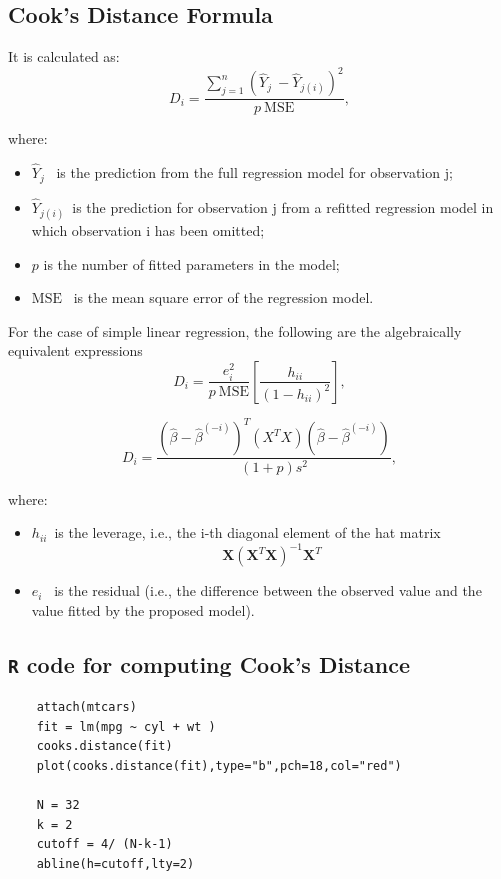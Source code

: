 \documentclass[residuals.tex]{subfiles}
\begin{document}
\subsection*{Cook's Distance Formula}
It is calculated as:
\[D_i = \frac{ \sum_{j=1}^n (\hat Y_j\ - \hat Y_{j(i)})^2 }{p \ \mathrm{MSE}},
\]

where:
\begin{itemize}
	\item $\hat Y_j$ \, is the prediction from the full regression model for observation j;
	\item $\hat Y_{j(i)}$\, is the prediction for observation j from a refitted regression model in which observation i has been omitted;
	\item $p$ is the number of fitted parameters in the model;
	\item $\mathrm{MSE} $ \, is the mean square error of the regression model.
	
\end{itemize}
\newpage
For the case of simple linear regression, the following are the algebraically equivalent expressions 
\[D_i = \frac{e_i^2}{p \ \mathrm{MSE}}\left[\frac{h_{ii}}{(1-h_{ii})^2}\right],
\]

\[
D_i = \frac{ (\hat \beta - \hat {\beta}^{(-i)})^T(X^TX)(\hat \beta - \hat {\beta}^{(-i)}) } {(1+p)s^2},
\]

where:
\begin{itemize}
\item $h_{ii} \,$ is the leverage, i.e., the i-th diagonal element of the hat matrix  \[\mathbf{X}\left(\mathbf{X}^T\mathbf{X}\right)^{-1}\mathbf{X}^T\]
\item $e_i$ \, is the residual (i.e., the difference between the observed value and the value fitted by the proposed model).
\end{itemize}


\bigskip
	

	\newpage
\subsection*{ \texttt{R} code for computing Cook's Distance}	
\begin{framed}
	\begin{verbatim}
	attach(mtcars)
	fit = lm(mpg ~ cyl + wt )
	cooks.distance(fit)
	plot(cooks.distance(fit),type="b",pch=18,col="red")
	
	N = 32
	k = 2
	cutoff = 4/ (N-k-1)
	abline(h=cutoff,lty=2)
	\end{verbatim}
\end{framed}
\end{document}
